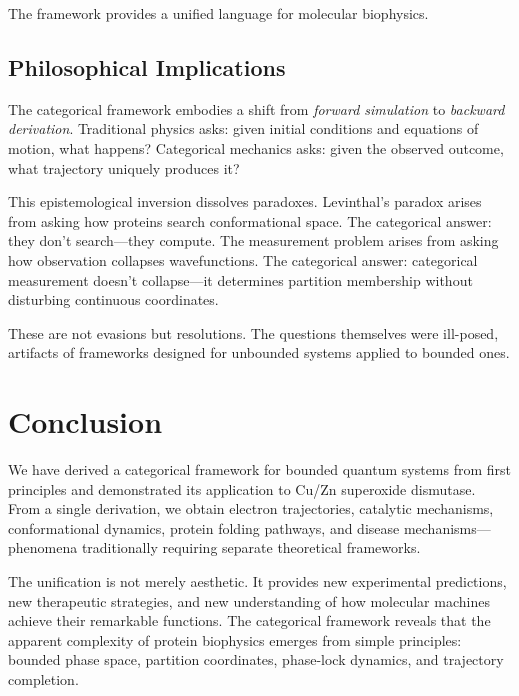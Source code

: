 \documentclass[twocolumn,aps,prx,superscriptaddress,longbibliography]{revtex4-2}
\theoremstyle{remark}
\begin{document}
The framework provides a unified language for molecular biophysics.

\subsection{Philosophical Implications}

The categorical framework embodies a shift from \textit{forward simulation}
to \textit{backward derivation}. Traditional physics asks: given initial
conditions and equations of motion, what happens? Categorical mechanics
asks: given the observed outcome, what trajectory uniquely produces it?

This epistemological inversion dissolves paradoxes. Levinthal's paradox
arises from asking how proteins search conformational space. The
categorical answer: they don't search---they compute. The measurement
problem arises from asking how observation collapses wavefunctions. The
categorical answer: categorical measurement doesn't collapse---it
determines partition membership without disturbing continuous coordinates.

These are not evasions but resolutions. The questions themselves were
ill-posed, artifacts of frameworks designed for unbounded systems applied
to bounded ones.

\section{Conclusion}
\label{sec:conclusion}

We have derived a categorical framework for bounded quantum systems from
first principles and demonstrated its application to Cu/Zn superoxide
dismutase. From a single derivation, we obtain electron trajectories,
catalytic mechanisms, conformational dynamics, protein folding pathways,
and disease mechanisms---phenomena traditionally requiring separate
theoretical frameworks.

The unification is not merely aesthetic. It provides new experimental
predictions, new therapeutic strategies, and new understanding of how
molecular machines achieve their remarkable functions. The categorical
framework reveals that the apparent complexity of protein biophysics
emerges from simple principles: bounded phase space, partition coordinates,
phase-lock dynamics, and trajectory completion.
\end{document}

